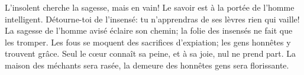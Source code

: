 L’insolent cherche la sagesse, mais en vain!
	Le savoir est à la portée de l’homme intelligent.
Détourne-toi de l’insensé:
	tu n’apprendras de ses lèvres rien qui vaille!
La sagesse de l’homme avisé éclaire son chemin;
	la folie des insensés ne fait que les tromper.
Les fous se moquent des sacrifices d’expiation;
	les gens honnêtes y trouvent grâce.
Seul le cœur connaît sa peine,
	et à sa joie, nul ne prend part.
La maison des méchants sera rasée,
	la demeure des honnêtes gens sera florissante.
